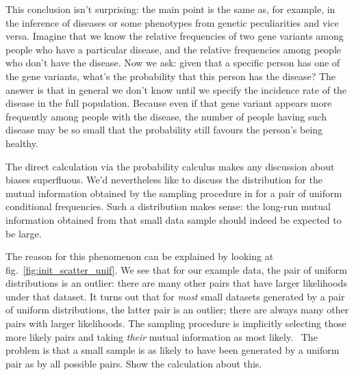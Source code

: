 \documentclass[\ifafour a4paper,12pt,\else a5paper,10pt,\fi%
onecolumn,oneside,article,%
british%
]{memoir}
\theoremstyle{remark}
\theoremstyle{innote}
\newcommand*{\citep}{\parencites}
\renewcommand*{\|}{\nonscript\,\vert\nonscript\;\mathopen{}}
\newcommand*{\fig}{fig.}%
\newcommand*{\puzzle}{{\fontencoding{U}\fontfamily{fontawesometwo}\selectfont\symbol{225}}}
\newcommand{\mynote}[1]{ {\color{notecolour}\puzzle\ #1}}
\begin{document}
This conclusion isn't surprising: the main point is the same as, for
example, in the inference of diseases or some phenotypes from genetic
peculiarities and vice versa. Imagine that we know the relative frequencies
of two gene variants among people who have a particular disease, and the
relative frequencies among people who don't have the disease. Now we ask:
given that a specific person has one of the gene variants, what's the
probability that this person has the disease? The answer is that in general
we don't know until we specify the incidence rate of the disease in the
full population. Because even if that gene variant appears more frequently among
people with the disease, the number of people having such disease may be so
small that the probability still favours the person's being healthy.

The direct calculation via the probability calculus
\citep{jaynes1994_r2003,soxetal1988_r2013,hailperin1996} makes any
discussion about biases superfluous. We'd nevertheless like to discuss the
distribution for the mutual information obtained by the sampling procedure
in \citep{panzerietal2007} for a pair of uniform conditional frequencies.
Such a distribution makes sense: the long-run mutual information obtained
from that small data sample should indeed be expected to be large.

The reason for this phenomenon can be explained by looking at
\fig~\ref{fig:init_scatter_unif}. We see that for our example data, the
pair of uniform distributions is an outlier: there are many other pairs
that have larger likelihoods under that dataset. It turns out that for
\emph{most} small datasets generated by a pair of uniform distributions,
the latter pair is an outlier; there are always many other pairs with
larger likelihoods. The sampling procedure is implicitly selecting those
more likely pairs and taking \emph{their} mutual information as most
likely. \mynote{The problem is that a small sample is as likely to have
  been generated by a uniform pair as by all possible pairs. Show the
  calculation about this.}
\end{document}
